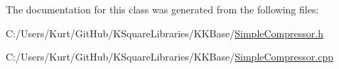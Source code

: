 The documentation for this class was generated from the following files\+:\begin{DoxyCompactItemize}
\item 
C\+:/\+Users/\+Kurt/\+Git\+Hub/\+K\+Square\+Libraries/\+K\+K\+Base/\hyperlink{_simple_compressor_8h}{Simple\+Compressor.\+h}\item 
C\+:/\+Users/\+Kurt/\+Git\+Hub/\+K\+Square\+Libraries/\+K\+K\+Base/\hyperlink{_simple_compressor_8cpp}{Simple\+Compressor.\+cpp}\end{DoxyCompactItemize}
